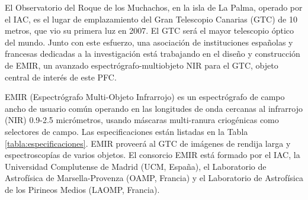 El Observatorio del Roque de los Muchachos, en la isla de La Palma, operado por
el IAC, es el lugar de emplazamiento del
Gran Telescopio Canarias (GTC) de 10 metros, que vio su primera luz en 2007. El
GTC será el mayor telescopio óptico del mundo. Junto con este esfuerzo, una
asociación de instituciones españolas y francesas dedicadas a la investigación
está trabajando en el diseño y construcción de EMIR, un avanzado
espectrógrafo-multiobjeto NIR para el GTC, objeto central de interés de este PFC.

EMIR (Espectrógrafo Multi-Objeto Infrarrojo) es un espectrógrafo de campo ancho
de usuario común operando en las longitudes de onda cercanas al infrarrojo (NIR)
0.9-2.5 micrómetros, usando máscaras multi-ranura criogénicas como selectores de
campo. Las especificaciones están listadas en la Tabla \ref{tabla:especificaciones}. 
EMIR proveerá al GTC de imágenes de rendija larga y espectroscopías de varios
objetos. El consorcio EMIR está formado por el IAC, la Universidad Complutense
de Madrid (UCM, España), el Laboratorio de Astrofísica de Marsella-Provenza
(OAMP, Francia) y el Laboratorio de Astrofísica de los Pirineos Medios (LAOMP,
Francia). 

